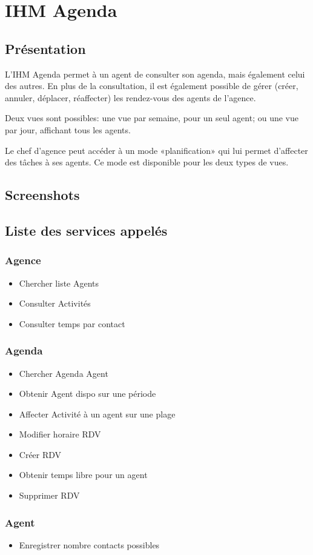 \section{IHM Agenda}

\subsection{Présentation}

L'IHM Agenda permet à un agent de consulter son agenda, mais également
celui des autres. En plus de la consultation, il est également possible
de gérer (créer, annuler, déplacer, réaffecter) les rendez-vous des
agents de l'agence.

Deux vues sont possibles: une vue par semaine, pour un seul agent; ou
une vue par jour, affichant tous les agents.

Le chef d'agence peut accéder à un mode «planification» qui lui permet
d'affecter des tâches à ses agents. Ce mode est disponible pour les
deux types de vues.

\subsection{Screenshots}

\subsection{Liste des services appelés}

    \subsubsection{Agence}
    
        \begin{itemize}
            \item Chercher liste Agents
            \item Consulter Activités
            \item Consulter temps par contact
        \end{itemize}

    \subsubsection{Agenda}

        \begin{itemize}
            \item Chercher Agenda Agent
            \item Obtenir Agent dispo sur une période
            \item Affecter Activité à un agent sur une plage
            \item Modifier horaire RDV
            \item Créer RDV
            \item Obtenir temps libre pour un agent
            \item Supprimer RDV
        \end{itemize}

    \subsubsection{Agent}

        \begin{itemize}
            \item Enregistrer nombre contacts possibles 
        \end{itemize}

